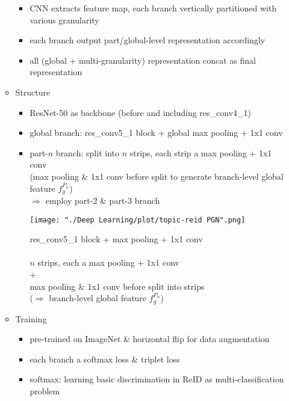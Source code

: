 \begin{itemize}
\begin{itemize}
\begin{itemize}
		\item CNN extracts feature map, each branch vertically partitioned with various granularity
		\item each branch output part/global-level representation accordingly
		\item all (global + multi-granularity) representation concat as final representation
		\end{itemize}
	\item Structure
		\begin{itemize}
		\item ResNet-50 as backbone (before and including res\_conv4\_1)
		\item global branch: res\_conv5\_1 block + global max pooling + 1x1 conv
		\item part-$n$ branch: split into $n$ strips, each strip a max pooling + 1x1 conv \\
		(max pooling \& 1x1 conv before split to generate branch-level global feature $f^{P_n}_g$) \\
		$\Rightarrow$ employ part-$2$ \& part-$3$ branch \\
		\begin{minipage}[r]{0.5\linewidth}
		\texttt{[image: "./Deep Learning/plot/topic-reid PGN".png]}
		\end{minipage}
		\begin{minipage}[l]{\linewidth}
		res\_conv5\_1 block + max pooling + 1x1 conv \\ \\
		$n$ strips, each a max pooling + 1x1 conv \\
		\phantom{x}\hspace{1cm} + \\
		max pooling \& 1x1 conv before split into strips \\ 
		($\Rightarrow$ branch-level global feature $f^{P_n}_g$) \\
		\end{minipage}
		\end{itemize}
	\item Training
		\begin{itemize}
		\item pre-trained on ImageNet \& horizontal flip for data augmentation
		\item each branch a softmax loss \& triplet loss \\
		\item softmax: learning basic discrimination in ReID as multi-classification problem \\ 

\end{itemize}
\end{itemize}
\end{itemize}
